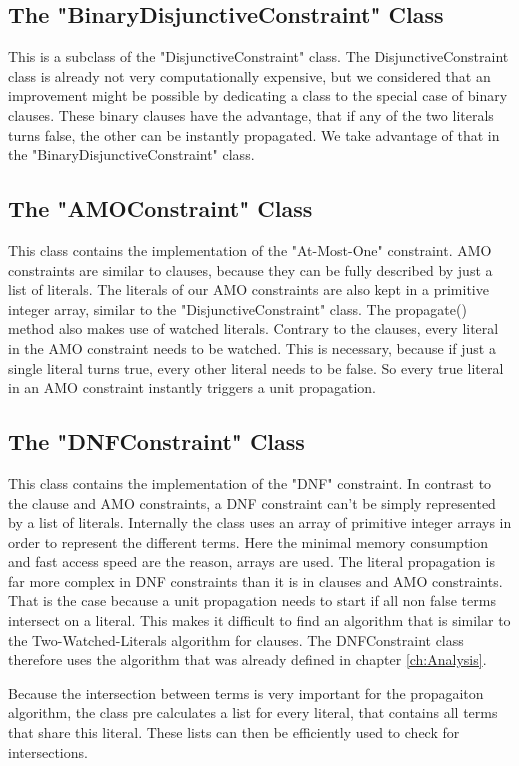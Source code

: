 \subsection{The "BinaryDisjunctiveConstraint" Class}

This is a subclass of the "DisjunctiveConstraint" class. The DisjunctiveConstraint class is already not very computationally expensive, but we considered that an improvement might be possible by dedicating a class to the special case of binary clauses. These binary clauses have the advantage, that if any of the two literals turns false, the other can be instantly propagated. We take advantage of that in the "BinaryDisjunctiveConstraint" class.

\subsection{The "AMOConstraint" Class}

This class contains the implementation of the "At-Most-One" constraint. AMO constraints are similar to clauses, because they can be fully described by just a list of literals.
The literals of our AMO constraints are also kept in a primitive integer array, similar to the "DisjunctiveConstraint" class. The propagate() method also makes use of watched literals. Contrary to the clauses, every literal in the AMO constraint needs to be watched. This is necessary, because if just a single literal turns true, every other literal needs to be false. So every true literal in an AMO constraint instantly triggers a unit propagation.

\subsection{The "DNFConstraint" Class}

This class contains the implementation of the "DNF" constraint. In contrast to the clause and AMO constraints, a DNF constraint can't be simply represented by a list of literals. Internally the class uses an array of primitive integer arrays in order to represent the different terms. Here the minimal memory consumption and fast access speed are the reason, arrays are used. The literal propagation is far more complex in DNF constraints than it is in clauses and AMO constraints. That is the case because a unit propagation needs to start if all non false terms intersect on a literal. This makes it difficult to find an algorithm that is similar to the Two-Watched-Literals algorithm for clauses. The DNFConstraint class therefore uses the algorithm that was already defined in chapter \ref{ch:Analysis}.
\par
Because the intersection between terms is very important for the propagaiton algorithm, the class pre calculates a list for every literal, that contains all terms that share this literal. These lists can then be efficiently used to check for intersections.

